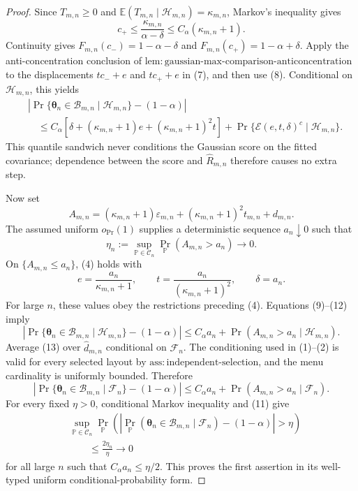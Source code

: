 \documentclass{article}
\begin{document}
\begin{proof}
Since \(T_{m,n}\ge0\) and \(\mathbb E(T_{m,n}\mid\mathcal H_{m,n})=\kappa_{m,n}\), Markov's inequality gives
\[
 c_+\le \frac{\kappa_{m,n}}{\alpha-\delta}
 \le C_\alpha(\kappa_{m,n}+1).                                   \tag{8}
\]
Continuity gives \(F_{m,n}(c_-)=1-\alpha-\delta\) and \(F_{m,n}(c_+)=1-\alpha+\delta\).  Apply the anti-concentration conclusion of \(\mathrm{lem{:}gaussian\mbox{-}max\mbox{-}comparison\mbox{-}anticoncentration}\) to the displacements \(tc_-+e\) and \(tc_++e\) in (7), and then use (8).  Conditional on \(\mathcal H_{m,n}\), this yields
\[
\begin{aligned}
 &\left|\Pr\{\boldsymbol\theta_n\in\mathcal B_{m,n}
       \mid\mathcal H_{m,n}\}-(1-\alpha)\right|\\
 &\quad\le C_\alpha\!\left[
 \delta+(\kappa_{m,n}+1)e+(\kappa_{m,n}+1)^2t\right]
 +\Pr\{\mathcal E(e,t,\delta)^c\mid\mathcal H_{m,n}\}.          \tag{9}
\end{aligned}
\]
This quantile sandwich never conditions the Gaussian score on the fitted covariance; dependence between the score and \(\widehat R_{m,n}\) therefore causes no extra step.

Now set
\[
 A_{m,n}=(\kappa_{m,n}+1)\varepsilon_{m,n}
 +(\kappa_{m,n}+1)^2t_{m,n}+d_{m,n}.                               \tag{10}
\]
The assumed uniform \(o_{\Pr}(1)\) supplies a deterministic sequence \(a_n\downarrow0\) such that
\[
 \eta_n:=\sup_{\mathbb P\in\mathcal C_n}
 \Pr_{\mathbb P}(A_{m,n}>a_n)\longrightarrow0.                    \tag{11}
\]
On \(\{A_{m,n}\le a_n\}\), (4) holds with
\[
 e=\frac{a_n}{\kappa_{m,n}+1},\qquad
 t=\frac{a_n}{(\kappa_{m,n}+1)^2},\qquad
 \delta=a_n.                                                       \tag{12}
\]
For large \(n\), these values obey the restrictions preceding (4).  Equations (9)--(12) imply
\[
 \left|\Pr\{\boldsymbol\theta_n\in\mathcal B_{m,n}
       \mid\mathcal H_{m,n}\}-(1-\alpha)\right|
 \le C_\alpha a_n+\Pr(A_{m,n}>a_n\mid\mathcal H_{m,n}).           \tag{13}
\]
Average (13) over \(\widehat d_{m,n}\) conditional on \(\mathcal F_n\).  The conditioning used in (1)--(2) is valid for every selected layout by \(\mathrm{ass{:}independent\mbox{-}selection}\), and the menu cardinality is uniformly bounded.  Therefore
\[
 \left|\Pr\{\boldsymbol\theta_n\in\mathcal B_{m,n}
       \mid\mathcal F_n\}-(1-\alpha)\right|
 \le C_\alpha a_n+\Pr(A_{m,n}>a_n\mid\mathcal F_n).               \tag{14}
\]
For every fixed \(\eta>0\), conditional Markov inequality and (11) give
\[
\begin{aligned}
 &\sup_{\mathbb P\in\mathcal C_n}
 \Pr_{\mathbb P}\!\left(
 \left|\Pr_{\mathbb P}(\boldsymbol\theta_n\in\mathcal B_{m,n}
 \mid\mathcal F_n)-(1-\alpha)\right|>\eta\right)\\
 &\qquad\le
 \frac{2\eta_n}{\eta}\longrightarrow0                            \tag{15}
\end{aligned}
\]
for all large \(n\) such that \(C_\alpha a_n\le\eta/2\).  This proves the first assertion in its well-typed uniform conditional-probability form.


\end{proof}
\end{document}
